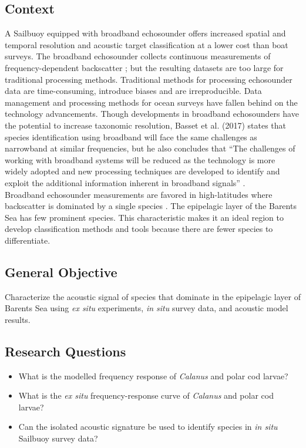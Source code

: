 \documentclass[a4paper, 12pt, Ariel]{article}
\begin{document}
\subsection{Context}
A Sailbuoy equipped with broadband echosounder offers increased spatial and temporal resolution and acoustic target classification \cite{Korneliussen2018} at a lower cost than boat surveys. The broadband echosounder collects continuous measurements of frequency-dependent backscatter \cite{Bassett2017}; but the resulting datasets are too large for traditional processing methods. Traditional methods for processing echosounder data are time-consuming, introduce biases and are irreproducible. Data management and processing methods for ocean surveys have fallen behind on the technology advancements. Though developments in broadband echosounders have the potential to increase taxonomic resolution, Basset et al. (2017) states that species identification using broadband will face the same challenges as narrowband at similar frequencies, but he also concludes that “The challenges of working with broadband systems will be reduced as the technology is more widely adopted and new processing techniques are developed to identify and exploit the additional information inherent in broadband signals” \cite{Bassett2017}. \\

Broadband echosounder measurements are favored in high-latitudes where backscatter is dominated by a single species \cite{DeRobertis2019}. The epipelagic layer of the Barents Sea has few prominent species. This characteristic makes it an ideal region to develop classification methods and tools because there are fewer species to differentiate.

\subsection{General Objective}
Characterize the acoustic signal of species that dominate in the epipelagic layer of Barents Sea using \textit{ex situ} experiments, \textit{in situ} survey data, and acoustic model results.

\subsection{Research Questions}
\begin{itemize}
\item{What is the modelled frequency response of \textit{Calanus} and polar cod larvae?}
\item{What is the \textit{ex situ} frequency-response curve of \textit{Calanus} and polar cod larvae?}
\item{Can the isolated acoustic signature be used to identify species in \textit{in situ} Sailbuoy survey data?}
\end{itemize}
\end{document}
